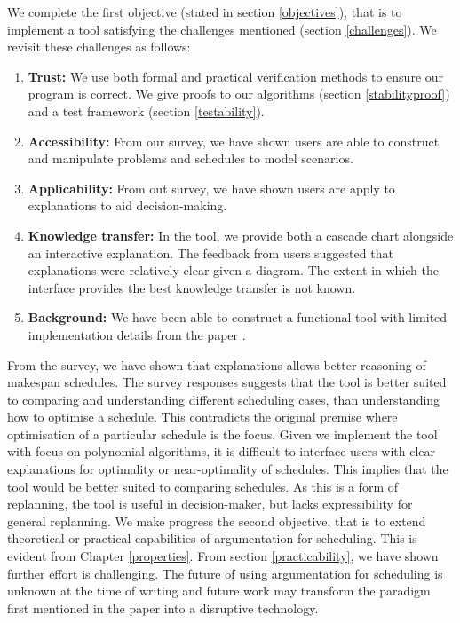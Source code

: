 We complete the first objective (stated in section \ref{objectives}), that is to implement a tool satisfying the challenges mentioned (section \ref{challenges}). We revisit these challenges as follows:
\begin{enumerate}
	\item\textbf{Trust:} We use both formal and practical verification methods to ensure our program is correct. We give proofs to our algorithms (section \ref{stabilityproof}) and a test framework (section \ref{testability}).
	\item\textbf{Accessibility:} From our survey, we have shown users are able to construct and manipulate problems and schedules to model scenarios.
	\item\textbf{Applicability:} From out survey, we have shown users are apply to explanations to aid decision-making.
	\item\textbf{Knowledge transfer:} In the tool, we provide both a cascade chart alongside an interactive explanation. The feedback from users suggested that explanations were relatively clear given a diagram. The extent in which the interface provides the best knowledge transfer is not known.
	\item\textbf{Background:} We have been able to construct a functional tool with limited implementation details from the paper \cite{aes}.
\end{enumerate}

From the survey, we have shown that explanations allows better reasoning of makespan schedules. The survey responses suggests that the tool is better suited to comparing and understanding different scheduling cases, than understanding how to optimise a schedule. This contradicts the original premise where optimisation of a particular schedule is the focus. Given we implement the tool with focus on polynomial algorithms, it is difficult to interface users with clear explanations for optimality or near-optimality of schedules. This implies that the tool would be better suited to comparing schedules. As this is a form of replanning, the tool is useful in decision-maker, but lacks expressibility for general replanning.
\linespace
We make progress the second objective, that is to extend theoretical or practical capabilities of argumentation for scheduling. This is evident from Chapter \ref{properties}. From section \ref{practicability}, we have shown further effort is challenging. The future of using argumentation for scheduling is unknown at the time of writing and future work may transform the paradigm first mentioned in the paper \cite{aes} into a disruptive technology.

